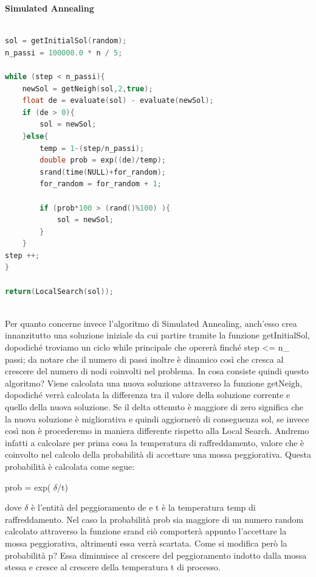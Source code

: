 \documentclass[preprint,12pt]{elsarticle}
\begin{document}
\begin{large}
\textbf{Simulated Annealing}
\end{large}


\begin{lstlisting}[basicstyle=\small, caption={Simulated Annealing}, frame=single, language=C++]

sol = getInitialSol(random);
n_passi = 100000.0 * n / 5;

while (step < n_passi){
	newSol = getNeigh(sol,2,true);			
	float de = evaluate(sol) - evaluate(newSol);
	if (de > 0){
		sol = newSol;
	}else{ 
		temp = 1-(step/n_passi);	
		double prob = exp((de)/temp);	
		srand(time(NULL)+for_random);		
		for_random = for_random + 1;
		
		if (prob*100 > (rand()%100) ){
			sol = newSol;
		}
	}
step ++; 
}

return(LocalSearch(sol));
	
\end{lstlisting}

Per quanto concerne invece l'algoritmo di Simulated Annealing, anch'esso crea innanzitutto una soluzione iniziale da cui partire tramite la funzione getInitialSol, dopodiché troviamo un ciclo while principale che opererà finché step <= n\_
passi; da notare che il numero di passi inoltre è dinamico così che cresca al crescere del numero di nodi coinvolti nel problema. In cosa consiste quindi questo algoritmo? Viene calcolata una nuova soluzione attraverso la funzione getNeigh, dopodiché verrà calcolata la differenza tra il valore della soluzione corrente e quello della nuova soluzione. Se il delta ottenuto è maggiore di zero significa che la nuova soluzione è migliorativa e quindi aggiornerò di conseguenza sol, se invece così non è procederemo in maniera differente rispetto alla Local Search. Andremo infatti a calcolare per prima cosa la temperatura di raffreddamento, valore che è coinvolto nel calcolo della probabilità di accettare una mossa peggiorativa. Questa probabilità è calcolata come segue:

\begin{center}
prob = exp( $\delta$/t)
\end{center}

dove $\delta$ è l'entità del peggioramento de e t è la temperatura temp di raffreddamento. Nel caso la probabilità prob sia maggiore di un numero random calcolato attraverso la funzione srand ciò comporterà appunto l'accettare la mossa peggiorativa, altrimenti essa verrà scartata. Come si modifica però la probabilità p? Essa diminuisce al crescere del peggioramento indotto dalla mossa stessa e cresce al crescere della temperatura t di processo.
\end{document}

